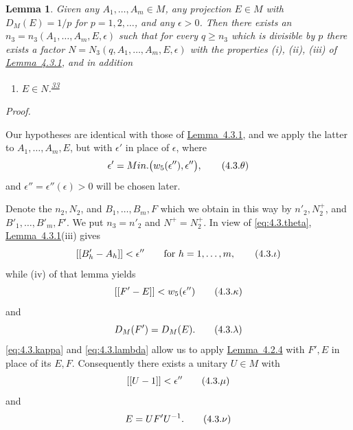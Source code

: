 \documentclass[b5paper,twoside]{article}
\newcommand{\lemref}[2]{\hyperref[#1]{\mbox{Lemma~#2}}}
\theoremstyle{mvnplain}
\newtheorem{lemma}{Lemma}[section]
\renewenvironment{proof}[1][Proof]{%
  \par\addvspace{0.35\baselineskip}%
  \noindent\textit{#1.}\ \normalfont\ignorespaces
}{%
  \par\addvspace{0.35\baselineskip}%
}
\newcommand{\M}{\mathbf M}
\newcommand{\N}{\mathbf N}
\newcommand{\Metric}[1]{\left[\!\left[#1\right]\!\right]}
\def\M{M}%
\def\N{N}%
\def\Metric#1{[[#1]]}%
\def\operatorname#1{#1}%
\begin{document}
\begin{lemma}\label{lem:4.3.2}
Given any \(A_1,\ldots,A_m\in\M\), any projection \(E\in\M\) with
\(D_{\M}(E)=1/p\) for \(p=1,2,\ldots\), and any \(\epsilon>0\). Then there
exists an \(n_3=n_3(A_1,\ldots,A_m,E,\epsilon)\) such that for every
\(q\ge n_3\) which is divisible by \(p\) there exists a factor
\(\N=\N_3(q,A_1,\ldots,A_m,E,\epsilon)\) with the properties (i), (ii),
(iii) of \lemref{lem:4.3.1}{4.3.1}, and in addition
\begin{enumerate}[label=\((\roman*')\),start=4]
\item \(E\in\N\).\textsuperscript{\hyperlink{fn:33}{33}}
\end{enumerate}
\end{lemma}

\begin{proof}
Our hypotheses are identical with those of \lemref{lem:4.3.1}{4.3.1}, and we
apply the latter to \(A_1,\ldots,A_m,E\), but with \(\epsilon'\) in place of
\(\epsilon\), where
\begin{equation}\label{eq:4.3.theta}
  \epsilon'=\operatorname {Min.}\bigl(w_5(\epsilon''),\epsilon''\bigr),
  \tag{4.3.\ensuremath{\theta}}
\end{equation}
and \(\epsilon''=\epsilon''(\epsilon)>0\) will be chosen later.

Denote the \(n_2,\N_2\), and \(B_1,\ldots,B_m,F\) which we obtain in this
way by \(n'_2,\N_2^+\), and \(B'_1,\ldots,B'_m,F'\). We put
\(n_3=n'_2\) and \(\N^+=\N_2^+\). In view of \eqref{eq:4.3.theta},
\lemref{lem:4.3.1}{4.3.1}(iii) gives
\begin{equation}\label{eq:4.3.iota}
  \Metric{B'_h-A_h}<\epsilon''\qquad\text{for }h=1,\ldots,m,
  \tag{4.3.\ensuremath{\iota}}
\end{equation}
while (iv) of that lemma yields
\begin{equation}\label{eq:4.3.kappa}
  \Metric{F'-E}<w_5(\epsilon'')
  \tag{4.3.\ensuremath{\kappa}}
\end{equation}
and
\begin{equation}\label{eq:4.3.lambda}
  D_{\M}(F')=D_{\M}(E).
  \tag{4.3.\ensuremath{\lambda}}
\end{equation}
\eqref{eq:4.3.kappa} and \eqref{eq:4.3.lambda} allow us to apply
\lemref{lem:4.2.4}{4.2.4} with \(F',E\) in place of its \(E,F\).
Consequently there exists a unitary \(U\in\M\) with
\begin{equation}\label{eq:4.3.mu}
  \Metric{U-1}<\epsilon''
  \tag{4.3.\ensuremath{\mu}}
\end{equation}
and
\begin{equation}\label{eq:4.3.nu}
  E=UF'U^{-1}.
  \tag{4.3.\ensuremath{\nu}}
\end{equation}


\end{proof}
\end{document}
